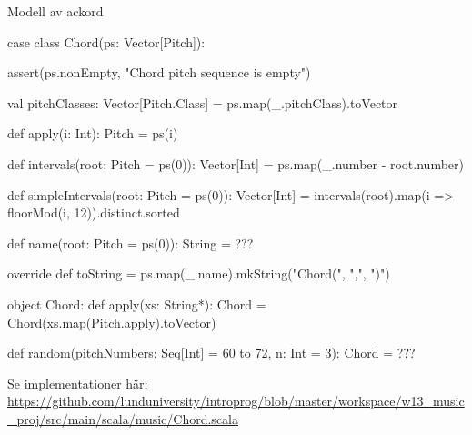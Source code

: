 \begin{Slide}{Modell av ackord}
\begin{CodeSmall}
case class Chord(ps: Vector[Pitch]):

assert(ps.nonEmpty, "Chord pitch sequence is empty")

  val pitchClasses: Vector[Pitch.Class] = ps.map(_.pitchClass).toVector

  def apply(i: Int): Pitch = ps(i)

  def intervals(root: Pitch = ps(0)): Vector[Int] = ps.map(_.number - root.number)

  def simpleIntervals(root: Pitch = ps(0)): Vector[Int] =
    intervals(root).map(i => floorMod(i, 12)).distinct.sorted

  def name(root: Pitch = ps(0)): String = ???

  override def toString = ps.map(_.name).mkString("Chord(", ",", ")")

object Chord:
  def apply(xs: String*): Chord = Chord(xs.map(Pitch.apply).toVector)

  def random(pitchNumbers: Seq[Int] = 60 to 72, n: Int = 3): Chord = ???
\end{CodeSmall}
\SlideFontTiny
Se implementationer här:
\url{https://github.com/lunduniversity/introprog/blob/master/workspace/w13_music_proj/src/main/scala/music/Chord.scala}
\end{Slide}

